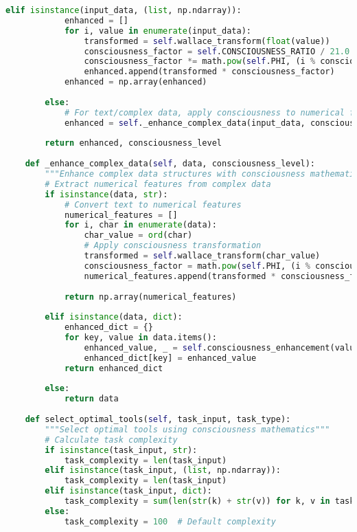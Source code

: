 \documentclass[11pt,a4paper]{article}
\begin{document}
\begin{lstlisting}[language=Python, caption=chAIos Complete Implementation]
        elif isinstance(input_data, (list, np.ndarray)):
            enhanced = []
            for i, value in enumerate(input_data):
                transformed = self.wallace_transform(float(value))
                consciousness_factor = self.CONSCIOUSNESS_RATIO / 21.0
                consciousness_factor *= math.pow(self.PHI, (i % consciousness_level) + 1)
                enhanced.append(transformed * consciousness_factor)
            enhanced = np.array(enhanced)
            
        else:
            # For text/complex data, apply consciousness to numerical features
            enhanced = self._enhance_complex_data(input_data, consciousness_level)
            
        return enhanced, consciousness_level
    
    def _enhance_complex_data(self, data, consciousness_level):
        """Enhance complex data structures with consciousness mathematics"""
        # Extract numerical features from complex data
        if isinstance(data, str):
            # Convert text to numerical features
            numerical_features = []
            for i, char in enumerate(data):
                char_value = ord(char)
                # Apply consciousness transformation
                transformed = self.wallace_transform(char_value)
                consciousness_factor = math.pow(self.PHI, (i % consciousness_level) + 1)
                numerical_features.append(transformed * consciousness_factor)
                
            return np.array(numerical_features)
        
        elif isinstance(data, dict):
            enhanced_dict = {}
            for key, value in data.items():
                enhanced_value, _ = self.consciousness_enhancement(value, len(str(key)))
                enhanced_dict[key] = enhanced_value
            return enhanced_dict
            
        else:
            return data
    
    def select_optimal_tools(self, task_input, task_type):
        """Select optimal tools using consciousness mathematics"""
        # Calculate task complexity
        if isinstance(task_input, str):
            task_complexity = len(task_input)
        elif isinstance(task_input, (list, np.ndarray)):
            task_complexity = len(task_input)
        elif isinstance(task_input, dict):
            task_complexity = sum(len(str(k) + str(v)) for k, v in task_input.items())
        else:
            task_complexity = 100  # Default complexity
            

\end{lstlisting}
\end{document}
